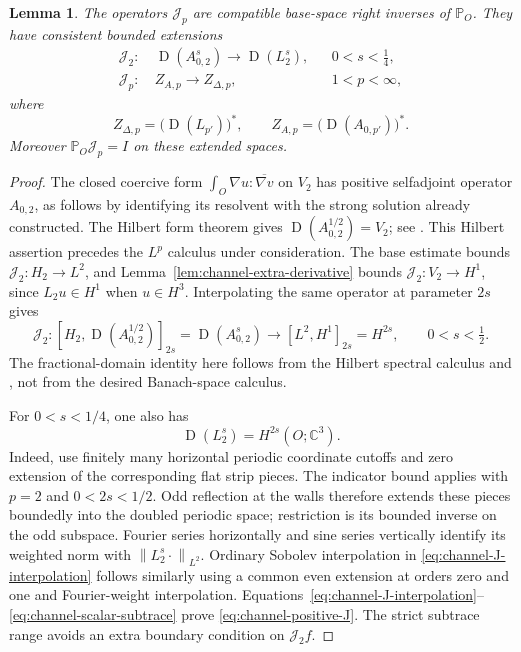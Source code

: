 \documentclass[11pt]{article}
\numberwithin{equation}{section}
\newtheorem{lemma}[theorem]{Lemma}
\theoremstyle{remark}
\newcommand{\C}{\mathbb C}
\newcommand{\PP}{\mathbb P}
\newcommand{\norm}[1]{\left\lVert#1\right\rVert}
\DeclareMathOperator{\Dom}{D}
\begin{document}
\begin{lemma}\label{lem:channel-compatible-right-inverses}
The operators $\mathcal J_p$ are compatible base-space right inverses
of $\PP_O$. They have consistent bounded extensions
\begin{align}
 \mathcal J_2:&\ \Dom(A_{0,2}^{s})\longrightarrow\Dom(L_2^{s}),
                     &&0<s<\tfrac14,\label{eq:channel-positive-J}\\
 \mathcal J_p:&\ Z_{A,p}\longrightarrow Z_{\Delta,p},
                     &&1<p<\infty,\label{eq:channel-negative-J}
\end{align}
where
\[
 Z_{\Delta,p}=\bigl(\Dom(L_{p'})\bigr)^*,\qquad
 Z_{A,p}=\bigl(\Dom(A_{0,p'})\bigr)^*.
\]
Moreover $\PP_O\mathcal J_p=I$ on these extended spaces.
\end{lemma}
\begin{proof}
The closed coercive form $\int_O\nabla u:\overline{\nabla v}$ on
$V_2$ has positive selfadjoint operator $A_{0,2}$, as follows by
identifying its resolvent with the strong solution already constructed.
The Hilbert form theorem gives
$\Dom(A_{0,2}^{1/2})=V_2$; see \cite[Theorem 2.13 and (3.51)]{Teschl}.
This Hilbert assertion precedes the $L^p$ calculus under consideration.
The base estimate bounds $\mathcal J_2:H_2\to L^2$, and
Lemma~\ref{lem:channel-extra-derivative} bounds
$\mathcal J_2:V_2\to H^1$, since $L_2u\in H^1$ when $u\in H^3$.
Interpolating the same operator at parameter $2s$ gives
\begin{equation}\label{eq:channel-J-interpolation}
 \mathcal J_2:
 [H_2,\Dom(A_{0,2}^{1/2})]_{2s}
   =\Dom(A_{0,2}^{s})
 \longrightarrow [L^2,H^1]_{2s}=H^{2s},\qquad 0<s<\tfrac12.
\end{equation}
The fractional-domain identity here follows from the Hilbert spectral
calculus and \cite[Proposition 2.2]{KKW}, not from the desired
Banach-space calculus.

For $0<s<1/4$, one also has
\begin{equation}\label{eq:channel-scalar-subtrace}
 \Dom(L_2^s)=H^{2s}(O;\C^3).
\end{equation}
Indeed, use finitely many horizontal periodic coordinate cutoffs and
zero extension of the corresponding flat strip pieces. The indicator
bound \cite[Proposition 2.4]{BG} applies with $p=2$ and
$0<2s<1/2$. Odd reflection at the walls therefore extends these
pieces boundedly into the doubled periodic space; restriction is its
bounded inverse on the odd subspace. Fourier series horizontally and
sine series vertically identify its weighted norm with
$\norm{L_2^s\cdot}_{L^2}$. Ordinary Sobolev interpolation in
\eqref{eq:channel-J-interpolation} follows similarly using a common
even extension at orders zero and one and Fourier-weight interpolation.
Equations~\eqref{eq:channel-J-interpolation}--\eqref{eq:channel-scalar-subtrace}
prove \eqref{eq:channel-positive-J}. The strict subtrace range avoids
an extra boundary condition on $\mathcal J_2f$.


\end{proof}
\end{document}
